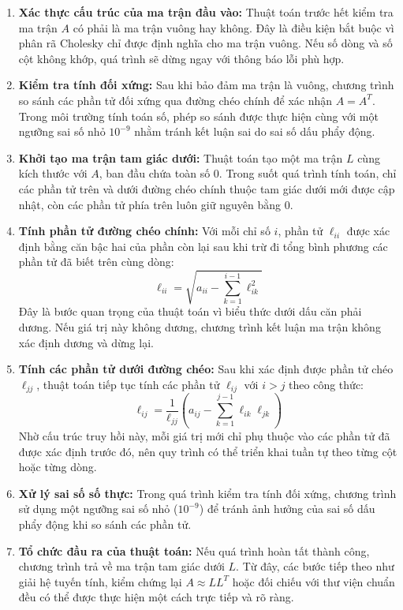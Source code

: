 \documentclass[12pt,a4paper]{article}
\begin{document}
\begin{enumerate}[label=\textbf{\alph*) Bước \arabic*:}, leftmargin=*, align=left]

\item \textbf{Xác thực cấu trúc của ma trận đầu vào:}
Thuật toán trước hết kiểm tra ma trận $A$ có phải là ma trận vuông hay không. Đây là điều kiện bắt buộc vì phân rã Cholesky chỉ được định nghĩa cho ma trận vuông. Nếu số dòng và số cột không khớp, quá trình sẽ dừng ngay với thông báo lỗi phù hợp.

\item \textbf{Kiểm tra tính đối xứng:}
Sau khi bảo đảm ma trận là vuông, chương trình so sánh các phần tử đối xứng qua đường chéo chính để xác nhận $A = A^T$. Trong môi trường tính toán số, phép so sánh được thực hiện cùng với một ngưỡng sai số nhỏ $10^{-9}$ nhằm tránh kết luận sai do sai số dấu phẩy động.

\item \textbf{Khởi tạo ma trận tam giác dưới:}
Thuật toán tạo một ma trận $L$ cùng kích thước với $A$, ban đầu chứa toàn số $0$. Trong suốt quá trình tính toán, chỉ các phần tử trên và dưới đường chéo chính thuộc tam giác dưới mới được cập nhật, còn các phần tử phía trên luôn giữ nguyên bằng $0$.

\item \textbf{Tính phần tử đường chéo chính:}
Với mỗi chỉ số $i$, phần tử $\ell_{ii}$ được xác định bằng căn bậc hai của phần còn lại sau khi trừ đi tổng bình phương các phần tử đã biết trên cùng dòng:
\begin{equation}
\ell_{ii} = \sqrt{a_{ii} - \sum_{k=1}^{i-1} \ell_{ik}^2}
\end{equation}
Đây là bước quan trọng của thuật toán vì biểu thức dưới dấu căn phải dương. Nếu giá trị này không dương, chương trình kết luận ma trận không xác định dương và dừng lại.

\item \textbf{Tính các phần tử dưới đường chéo:}
Sau khi xác định được phần tử chéo $\ell_{jj}$, thuật toán tiếp tục tính các phần tử $\ell_{ij}$ với $i > j$ theo công thức:
\begin{equation}
\ell_{ij} = \frac{1}{\ell_{jj}}\left(a_{ij} - \sum_{k=1}^{j-1} \ell_{ik}\ell_{jk}\right)
\end{equation}
Nhờ cấu trúc truy hồi này, mỗi giá trị mới chỉ phụ thuộc vào các phần tử đã được xác định trước đó, nên quy trình có thể triển khai tuần tự theo từng cột hoặc từng dòng.

\item \textbf{Xử lý sai số số thực:}
Trong quá trình kiểm tra tính đối xứng, chương trình sử dụng một ngưỡng sai số nhỏ ($10^{-9}$) để tránh ảnh hưởng của sai số dấu phẩy động khi so sánh các phần tử.

\item \textbf{Tổ chức đầu ra của thuật toán:}
Nếu quá trình hoàn tất thành công, chương trình trả về ma trận tam giác dưới $L$. Từ đây, các bước tiếp theo như giải hệ tuyến tính, kiểm chứng lại $A \approx LL^T$ hoặc đối chiếu với thư viện chuẩn đều có thể được thực hiện một cách trực tiếp và rõ ràng.

\end{enumerate}
\end{document}

